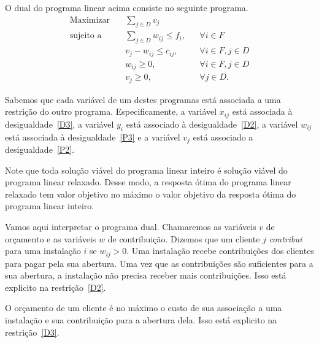        O dual do programa linear acima consiste no seguinte programa.
    \label{D}
    \begin{align}
        \text{Maximizar} \quad & \sum_{j \in D} v_{j}  \tag{PD} \label{D1}\\
        \text{sujeito a} \quad & \sum_{j\in D} w_{ij}\leq f_i, &&\forall i \in F \tag{D2} \label{D2}\\
        &v_{j} - w_{ij}\leq c_{ij},  &&\forall i\in F,j\in D \tag{D3} \label{D3}\\
        &w_{ij} \geq 0 , &&\forall i\in F,j\in D\tag{D4} \label{D4}\\
        &v_j \geq 0, &&\forall j\in D \tag{D5} \label{D5}.
       \end{align}

Sabemos que cada variável de um destes programas está associada a uma restrição do outro programa. 
Especificamente, a variável $x_{ij}$ está associada à desigualdade~\eqref{D3}, a variável $y_i$ está associado à desigualdade~\eqref{D2}, a variável $w_{ij}$ está associada à desigualdade~\eqref{P3} e a variável $v_j$ está associado a desigualdade~\eqref{P2}.

Note que toda solução viável do programa linear inteiro é solução viável do programa linear relaxado. Desse modo, a resposta ótima do programa linear relaxado tem valor objetivo no máximo o valor objetivo da resposta ótima do programa linear inteiro.

Vamos aqui interpretar o programa dual. Chamaremos as variáveis $v$ de orçamento e as variáveis $w$ de contribuição. Dizemos que um cliente $j$ \emph{contribui} para uma instalação $i$ se $w_{ij} > 0$. Uma instalação recebe contribuições dos clientes para pagar pela sua abertura. Uma vez que as contribuições são suficientes para a sua abertura, a instalação não precisa receber mais contribuições. Isso está explicito na restrição~\eqref{D2}.

O orçamento de um cliente é no máximo o custo de sua associação a uma instalação e sua contribuição para a abertura dela. Isso está explicito na restrição~\eqref{D3}.

